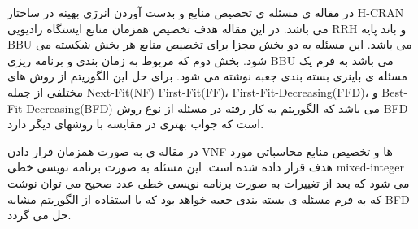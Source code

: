 در مقاله ی
\citep{wang2017joint}
مسئله ی تخصیص منابع و بدست آوردن انرژی بهینه در ساختار
H-CRAN
می باشد.
در این مقاله هدف تخصیص همزمان منابع ایستگاه رادیویی RRH و باند پایه BBU می باشد.
این مسئله به دو بخش مجزا برای تخصیص منابع هر بخش شکسته می شود.
بخش دوم که مربوط به زمان بندی و برنامه ریزی BBU می باشد به فرم یک مسئله ی باینری بسته بندی جعبه نوشته می شود.
برای حل این الگوریتم از روش های مختلفی از جمله
Next-Fit(NF)
First-Fit(FF)،
First-Fit-Decreasing(FFD)،
و
‌Best-Fit-Decreasing(BFD)
می باشد که الگوریتم به کار رفته در مسئله از نوع روش
BFD 
 است که جواب بهتری در مقایسه با روشهای دیگر دارد.  
 
در مقاله ی
\cite{de2020optimal}
به صورت همزمان قرار دادن VNF ها و تخصیص منابع محاسباتی مورد هدف قرار داده شده است.
این مسئله به صورت
برنامه نویسی خطی 
mixed-integer
می شود که بعد از تغییرات به صورت برنامه نویسی خطی عدد صحیح می توان نوشت که به فرم مسئله ی بسته بندی جعبه خواهد بود که با استفاده از الگوریتم مشابه
BFD حل می گردد.
